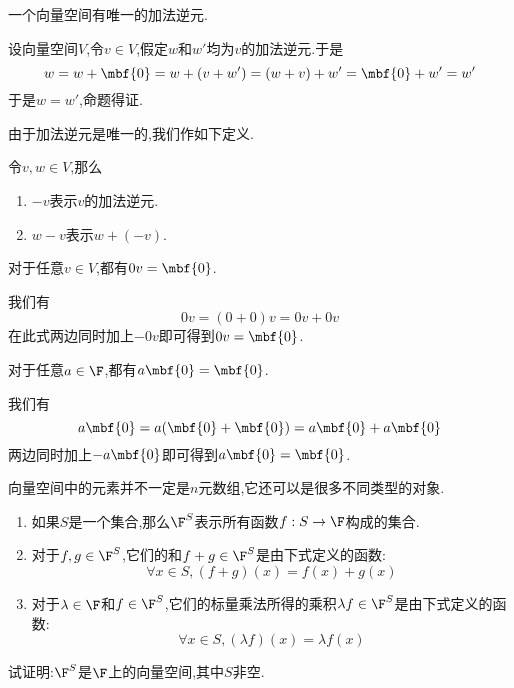 \documentclass{ctexart}
\begin{document}
\begin{formal}[1.3.2 加法逆元唯一]
    一个向量空间有唯一的加法逆元.
\end{formal}
\begin{solution}[1.3.2 Proof.]
    设向量空间$V$,令$v\in V$,假定$w$和$w'$均为$v$的加法逆元.于是
    $$w=w+\mbf{0}=w+(v+w')=(w+v)+w'=\mbf{0}+w'=w'$$
    于是$w=w'$,命题得证.
\end{solution}\noindent
由于加法逆元是唯一的,我们作如下定义.
\begin{definition}[1.3.3 定义:$-v,w-v$]
    令$v,w\in V$,那么
    \begin{enumerate}[label=\textbf{(\arabic*)}]
        \item $-v$表示$v$的加法逆元.
        \item $w-v$表示$w+(-v)$.
    \end{enumerate}
\end{definition}
\begin{formal}
    对于任意$v\in V$,都有$0v=\mbf{0}$.
\end{formal}
\begin{solution}[1.3.4 Proof.]
    我们有$$0v=(0+0)v=0v+0v$$
    在此式两边同时加上$-0v$即可得到$0v=\mbf{0}$.
\end{solution}
\begin{formal}
    对于任意$a\in\F$,都有$a\mbf{0}=\mbf{0}$.
\end{formal}
\begin{solution}[1.3.5 Proof.]
    我们有$$a\mbf{0}=a(\mbf{0}+\mbf{0})=a\mbf{0}+a\mbf{0}$$
    两边同时加上$-a\mbf{0}$即可得到$a\mbf{0}=\mbf{0}$.
\end{solution}\noindent
向量空间中的元素并不一定是$n$元数组,它还可以是很多不同类型的对象.
\begin{definition}[1.4 记号:$\F^S$]
    \begin{enumerate}[label=\textbf{(\arabic*)}]
        \item 如果$S$是一个集合,那么$\F^S$表示所有函数$f:S\to\F$构成的集合.
        \item 对于$f,g\in\F^S$,它们的和$f+g\in\F^S$是由下式定义的函数:$$\forall x\in S,(f+g)(x)=f(x)+g(x)$$
        \item 对于$\lambda\in\F$和$f\in\F^S$,它们的标量乘法所得的乘积$\lambda f\in\F^S$是由下式定义的函数:$$\forall x\in S,(\lambda f)(x)=\lambda f(x)$$
    \end{enumerate}
\end{definition}\noindent
\begin{formal}[1.4.1]
    试证明:$\F^S$是$\F$上的向量空间,其中$S$非空.
\end{formal}
\end{document}
